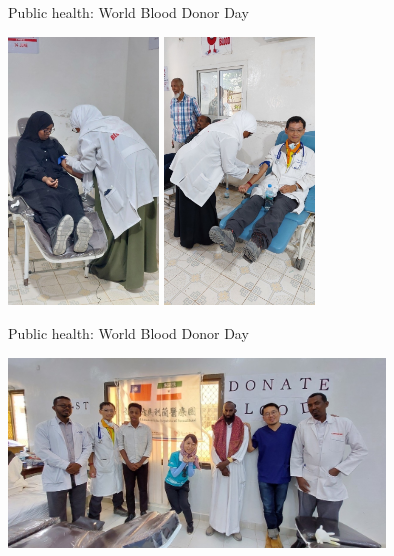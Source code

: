 \documentclass[aspectratio=169]{beamer}
\begin{document}
\begin{frame}{Public health: World Blood Donor Day}
    \begin{center}
        
        \includegraphics[width=0.30\textwidth]{IMG-4371.JPG}
        \includegraphics[width=0.30\textwidth]{IMG-4370.JPG}
    \end{center}
\end{frame}

\begin{frame}{Public health: World Blood Donor Day}
    \begin{center}
        
        \includegraphics[width=0.75\textwidth]{IMG-4441.JPG}
    \end{center}
\end{frame}
\end{document}
